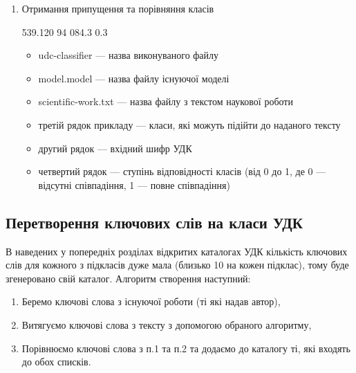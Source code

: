 \documentclass[14pt]{extarticle}
\begin{document}
\begin{enumerate}[labelindent=\dimexpr\parindent*2\relax, leftmargin=*]
    \item Отримання припущення та порівняння класів
      \begin{mycode}[caption={Припущення}
                    , label={code:result_ex2}]
        539.120 94 084.3
        0.3
      \end{mycode}
      \begin{itemize}
        \item udc-classifier --- назва виконуваного файлу
        \item model.model --- назва файлу існуючої моделі
        \item scientific-work.txt --- назва файлу з текстом наукової роботи
        \item третій рядок прикладу ---
        класи, які можуть підійти до наданого тексту
        \item другий рядок --- вхідний шифр УДК
        \item четвертий рядок --- ступінь відповідності класів
        (від 0 до 1, де 0 --- відсутні співпадіння, 1 --- повне співпадіння)
      \end{itemize}
  \end{enumerate}

  \subsection{Перетворення ключових слів на класи УДК}
  В наведених у попередніх розділах відкритих каталогах УДК
  кількість ключових слів для кожного з підкласів дуже мала
  (близько 10 на кожен підклас), тому буде згенеровано свій каталог.
  Алгоритм створення наступний:
  \begin{enumerate}[labelindent=\dimexpr\parindent*2\relax, leftmargin=*]
    \item Беремо ключові слова з існуючої роботи (ті які надав автор),
    \item Витягуємо ключові слова з тексту з допомогою обраного алгоритму,
    \item Порівнюємо ключові слова з п.1 та п.2 та додаємо до каталогу ті,
    які входять до обох списків.
  \end{enumerate}
\end{document}
